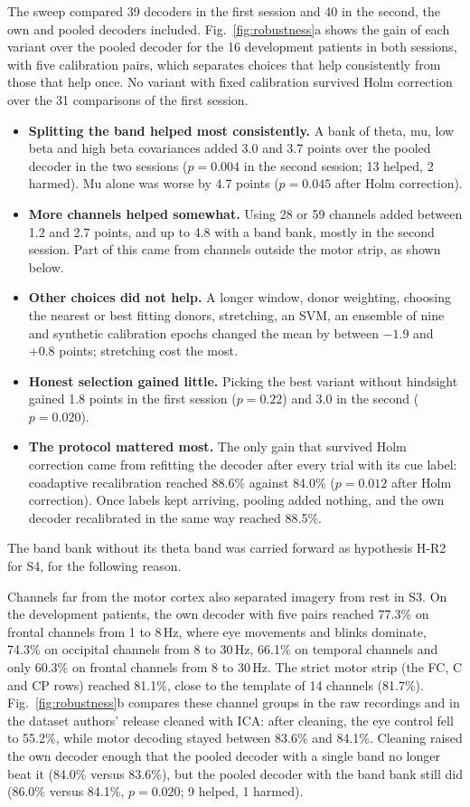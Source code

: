 \documentclass{ieeeaccess}
\begin{document}
The sweep compared 39 decoders in the first session and 40 in the second, the own and pooled decoders included. Fig.~\ref{fig:robustness}a shows the gain of each variant over the pooled decoder for the 16 development patients in both sessions, with five calibration pairs, which separates choices that help consistently from those that help once. No variant with fixed calibration survived Holm correction over the 31 comparisons of the first session.
\begin{itemize}
\item \textbf{Splitting the band helped most consistently.} A bank of theta, mu, low beta and high beta covariances added 3.0 and 3.7 points over the pooled decoder in the two sessions ($p = 0.004$ in the second session; 13 helped, 2 harmed). Mu alone was worse by 4.7 points ($p = 0.045$ after Holm correction).
\item \textbf{More channels helped somewhat.} Using 28 or 59 channels added between 1.2 and 2.7 points, and up to 4.8 with a band bank, mostly in the second session. Part of this came from channels outside the motor strip, as shown below.
\item \textbf{Other choices did not help.} A longer window, donor weighting, choosing the nearest or best fitting donors, stretching, an SVM, an ensemble of nine and synthetic calibration epochs changed the mean by between $-1.9$ and $+0.8$ points; stretching cost the most.
\item \textbf{Honest selection gained little.} Picking the best variant without hindsight gained 1.8 points in the first session ($p = 0.22$) and 3.0 in the second ($p = 0.020$).
\item \textbf{The protocol mattered most.} The only gain that survived Holm correction came from refitting the decoder after every trial with its cue label: coadaptive recalibration reached 88.6\% against 84.0\% ($p = 0.012$ after Holm correction). Once labels kept arriving, pooling added nothing, and the own decoder recalibrated in the same way reached 88.5\%.
\end{itemize}
The band bank without its theta band was carried forward as hypothesis H-R2 for S4, for the following reason.

Channels far from the motor cortex also separated imagery from rest in S3. On the development patients, the own decoder with five pairs reached 77.3\% on frontal channels from 1 to 8\,Hz, where eye movements and blinks dominate, 74.3\% on occipital channels from 8 to 30\,Hz, 66.1\% on temporal channels and only 60.3\% on frontal channels from 8 to 30\,Hz. The strict motor strip (the FC, C and CP rows) reached 81.1\%, close to the template of 14 channels (81.7\%). Fig.~\ref{fig:robustness}b compares these channel groups in the raw recordings and in the dataset authors' release cleaned with ICA: after cleaning, the eye control fell to 55.2\%, while motor decoding stayed between 83.6\% and 84.1\%. Cleaning raised the own decoder enough that the pooled decoder with a single band no longer beat it (84.0\% versus 83.6\%), but the pooled decoder with the band bank still did (86.0\% versus 84.1\%, $p = 0.020$; 9 helped, 1 harmed).
\end{document}

